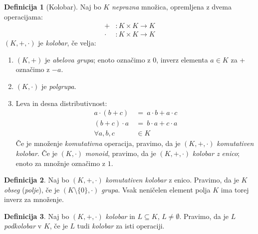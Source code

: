 \documentclass[11pt]{article}
\newcommand{\0}{\mathbf{0}}
\newcommand{\K}{K}
\renewcommand{\L}{L}
\theoremstyle{definition}
\newtheorem{definicija}{Definicija}[section]
\theoremstyle{definition}
\theoremstyle{definition}
\theoremstyle{definition}
\begin{document}
\begin{definicija}[Kolobar]

Naj bo $\K$ \textit{neprazna} množica, opremljena z dvema operacijama:
\begin{align*}
+&: \K\times\K \rightarrow \K \\
\cdot&: \K\times\K \rightarrow \K
\end{align*}
$(\K,+,\cdot)$ je \textit{kolobar}, če velja:
\begin{enumerate}

\item $(\K,+)$ je \textit{abelova grupa}; enoto označimo z $0$, inverz elementa $a \in \K$ za + označimo z $-a$.

\item $(\K,\cdot)$ je \textit{polgrupa}.

\item Leva in desna distributivnost:
\begin{align*}
a\cdot (b+c) ~&=~ a \cdot b + a \cdot c \\
(b+c)\cdot a ~&=~ b \cdot a + c \cdot a \\
\forall a,b,c &\in \K
\end{align*}
Če je množenje \textit{komutativna} operacija, pravimo, da je $(\K,+,\cdot)$ \textit{komutativen kolobar}. Če je $(\K,\cdot)$ \textit{monoid}, pravimo, da je $(\K,+,\cdot)$ \textit{kolobar z enico}; enoto za množnje označimo z $1$.

\end{enumerate}

\end{definicija}
\vspace{0.5cm}

\begin{definicija}

Naj bo $(\K,+,\cdot)$ \textit{komutativen kolobar} z enico. Pravimo, da je $\K$ \textit{obseg} (\textit{polje}), če je $(\K\setminus\{0\},\cdot)$ \textit{grupa}. Vsak neničelen element polja $\K$ ima torej inverz za množenje.

\end{definicija}
\vspace{0.5cm}

\begin{definicija}

Naj bo $(\K,+,\cdot)$ \textit{kolobar} in $\L \subseteq \K$, $\L \neq \emptyset$. Pravimo, da je $\L$ \textit{podkolobar} v $\K$, če je $\L$ tudi \textit{kolobar} za isti operaciji.

\end{definicija}
\vspace{0.5cm}
\end{document}
